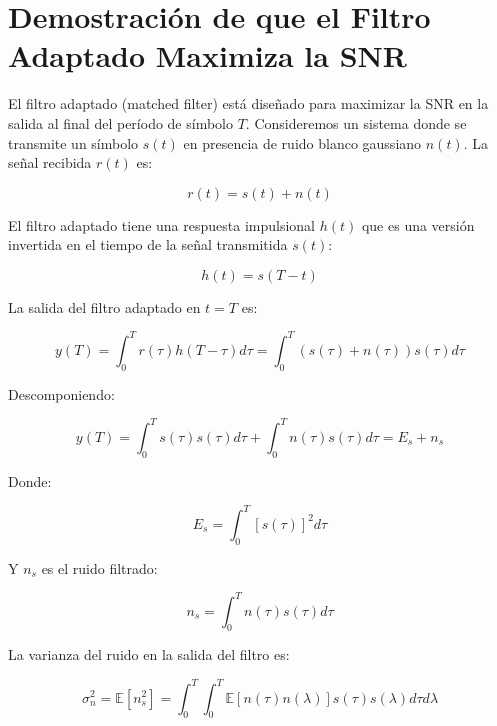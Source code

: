 \documentclass{article}
\begin{document}
\section*{Demostración de que el Filtro Adaptado Maximiza la SNR}

El filtro adaptado (matched filter) está diseñado para maximizar la SNR en la salida al final del período de símbolo \( T \). Consideremos un sistema donde se transmite un símbolo \( s(t) \) en presencia de ruido blanco gaussiano \( n(t) \). La señal recibida \( r(t) \) es:

\begin{equation}
r(t) = s(t) + n(t)
\end{equation}

El filtro adaptado tiene una respuesta impulsional \( h(t) \) que es una versión invertida en el tiempo de la señal transmitida \( s(t) \):

\begin{equation}
h(t) = s(T - t)
\end{equation}

La salida del filtro adaptado en \( t = T \) es:

\begin{equation}
y(T) = \int_{0}^{T} r(\tau) h(T - \tau) d\tau = \int_{0}^{T} (s(\tau) + n(\tau)) s(\tau) d\tau
\end{equation}

Descomponiendo:

\begin{equation}
y(T) = \int_{0}^{T} s(\tau) s(\tau) d\tau + \int_{0}^{T} n(\tau) s(\tau) d\tau = E_s + n_s
\end{equation}

Donde:

\begin{equation}
E_s = \int_{0}^{T} [s(\tau)]^2 d\tau
\end{equation}

Y \( n_s \) es el ruido filtrado:

\begin{equation}
n_s = \int_{0}^{T} n(\tau) s(\tau) d\tau
\end{equation}

La varianza del ruido en la salida del filtro es:

\begin{equation}
\sigma_n^2 = \mathbb{E}[n_s^2] = \int_{0}^{T} \int_{0}^{T} \mathbb{E}[n(\tau) n(\lambda)] s(\tau) s(\lambda) d\tau d\lambda
\end{equation}
\end{document}
